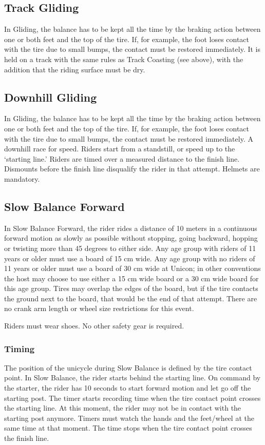 \subsection{Track Gliding}

In Gliding, the balance has to be kept all the time by the braking action between one or both feet and the top of the tire.
If, for example, the foot loses contact with the tire due to small bumps, the contact must be restored immediately.
It is held on a track with the same rules as Track Coasting (see above), with the addition that the riding surface must be dry.

\subsection{Downhill Gliding}
In Gliding, the balance has to be kept all the time by the braking action between one or both feet and the top of the tire.
If, for example, the foot loses contact with the tire due to small bumps, the contact must be restored immediately.
A downhill race for speed.
Riders start from a standstill, or speed up to the `starting line.'
Riders are timed over a measured distance to the finish line.
Dismounts before the finish line disqualify the rider in that attempt.
Helmets are mandatory.

\subsection{Slow Balance Forward}

In Slow Balance Forward, the rider rides a distance of 10 meters in a continuous forward motion as slowly as possible without stopping, going backward, hopping or twisting more than 45 degrees to either side.
Any age group with riders of 11 years or older must use a board of 15 cm wide.
Any age group with no riders of 11 years or older must use a board of 30 cm wide at Unicon; in other conventions the host may choose to use either a 15 cm wide board or a 30 cm wide board for this age group.
Tires may overlap the edges of the board, but if the tire contacts the ground next to the board, that would be the end of that attempt.
There are no crank arm length or wheel size restrictions for this event.

Riders must wear shoes.
No other safety gear is required.

\subsubsection{Timing}
The position of the unicycle during Slow Balance is defined by the tire contact point.
In Slow Balance, the rider starts behind the starting line.
On command by the starter, the rider has 10 seconds to start forward motion and let go off the starting post.
The timer starts recording time when the tire contact point crosses the starting line.
At this moment, the rider may not be in contact with the starting post anymore.
Timers must watch the hands and the feet/wheel at the same time at that moment.
The time stops when the tire contact point crosses the finish line.

